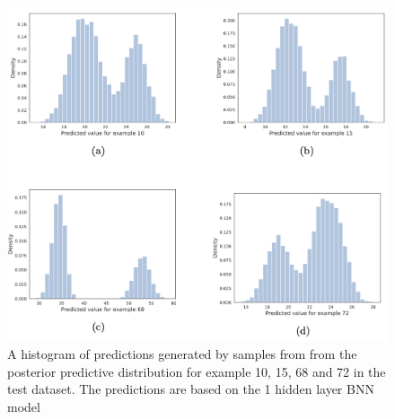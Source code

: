 \begin{table}
\caption{Performance measurement for Bayesian neural network models on Boston housing data. The Python code used to implement these Bayesian neural networks can be seen in appendix \ref{app:Boston_BNN}.}
\label{tab:Boston_BNN_performance}
\end{table}
\begin{figure}
    \centering
    \includegraphics[width=\textwidth]{pics/post_pred_Boston.png}
    \caption{A histogram of predictions generated by samples from from the posterior predictive distribution for example 10, 15, 68 and 72 in the test dataset. The predictions are based on the 1 hidden layer BNN model}
    \label{fig:post_pred_noston}
\end{figure}

